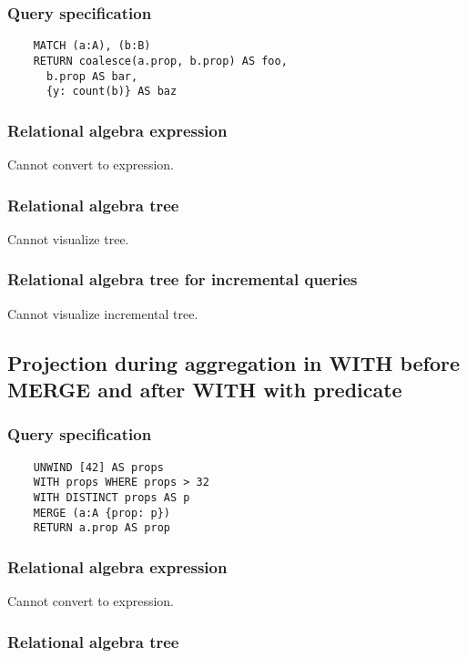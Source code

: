	\subsubsection*{Query specification}

	\begin{lstlisting}
	MATCH (a:A), (b:B)
	RETURN coalesce(a.prop, b.prop) AS foo,
	  b.prop AS bar,
	  {y: count(b)} AS baz
	\end{lstlisting}


	\subsubsection*{Relational algebra expression}

	Cannot convert to expression.

	\subsubsection*{Relational algebra tree}

	Cannot visualize tree.

	\subsubsection*{Relational algebra tree for incremental queries}

	Cannot visualize incremental tree.
	\subsection{Projection during aggregation in WITH before MERGE and after WITH with predicate}

	\subsubsection*{Query specification}

	\begin{lstlisting}
	UNWIND [42] AS props
	WITH props WHERE props > 32
	WITH DISTINCT props AS p
	MERGE (a:A {prop: p})
	RETURN a.prop AS prop
	\end{lstlisting}


	\subsubsection*{Relational algebra expression}

	Cannot convert to expression.

	\subsubsection*{Relational algebra tree}

